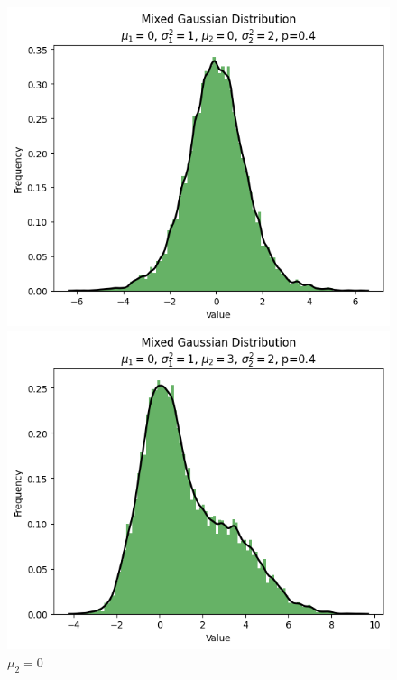 \documentclass{article}
\begin{document}
\begin{figure}[H]
\begin{minipage}[b]{0.2\linewidth}
    \end{minipage}
    \vspace{4mm} %
    \begin{minipage}[b]{0.2\linewidth}
        \centering
        \includegraphics[width=\linewidth]{figure/mu_2=0.png}
        \caption{$\mu_2=0$}
    \end{minipage}
    \hfill
    \begin{minipage}[b]{0.2\linewidth}
        \centering
        \includegraphics[width=\linewidth]{figure/mu_2=3.png}

\end{minipage}
\end{figure}
\end{document}

